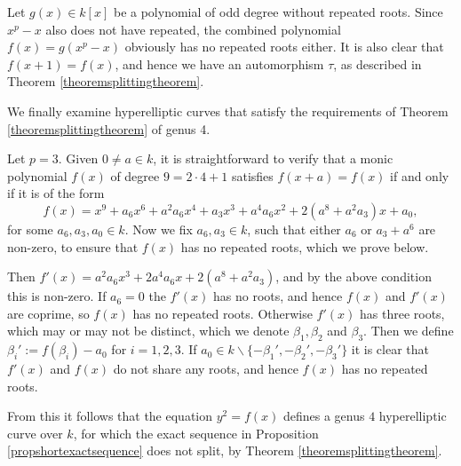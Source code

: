     \begin{ex}
    Let $g(x) \in k[x]$ be a polynomial of odd degree without repeated roots.
    Since $x^p -x$ also does not have repeated, the combined polynomial $f(x) = g(x^p - x)$ obviously has no repeated roots either.
    It is also clear that $f(x + 1) = f(x)$, and hence we have an automorphism $\tau$, as described in Theorem \ref{theoremsplittingtheorem}.
    \end{ex}

We finally examine hyperelliptic curves that satisfy the requirements of Theorem \ref{theoremsplittingtheorem} of genus 4.

    \begin{ex}
    Let $p = 3$.
    Given $0 \neq a \in k$, it is straightforward to verify that a monic polynomial $f(x)$ of degree $9 = 2\cdot 4 +1$ satisfies $f(x+a) = f(x)$ if and only if it is of the form
    \begin{equation*}
    f(x) = x^9 + a_6x^6 + a^2a_6x^4 + a_3x^3 + a^4a_6x^2 + 2(a^8 + a^2a_3)x + a_0,
    \end{equation*}
    for some $a_6, a_3, a_0 \in k$.
    Now we fix $a_6, a_3 \in k$, such that either $a_6$ or $a_3 + a^6$ are non-zero, to ensure that $f(x)$ has no repeated roots, which we prove below.
    
    Then $f'(x) = a^2a_6x^3 + 2a^4a_6x + 2(a^8 + a^2a_3)$, and by the above condition this is non-zero.
    If $a_6 = 0$ the $f'(x)$ has no roots, and hence $f(x)$ and $f'(x)$ are coprime, so $f(x)$ has no repeated roots.
    Otherwise $f'(x)$ has three roots, which may or may not be distinct, which we denote $\beta_1, \beta_2$ and $\beta_3$.
    Then we define $\beta_i' := f(\beta_i) - a_0$ for $i = 1, 2, 3$.
    If $a_0 \in k \backslash \{-\beta_1', -\beta_2', -\beta_3'\}$ it is clear that $f'(x)$ and $f(x)$ do not share any roots, and hence $f(x)$ has no repeated roots.
    
    
    From this it follows that the equation $y^2 = f(x)$ defines a genus $4$ hyperelliptic curve over $k$, for which the exact sequence in Proposition \ref{propshortexactsequence} does not split, by Theorem \ref{theoremsplittingtheorem}.
    \end{ex}




